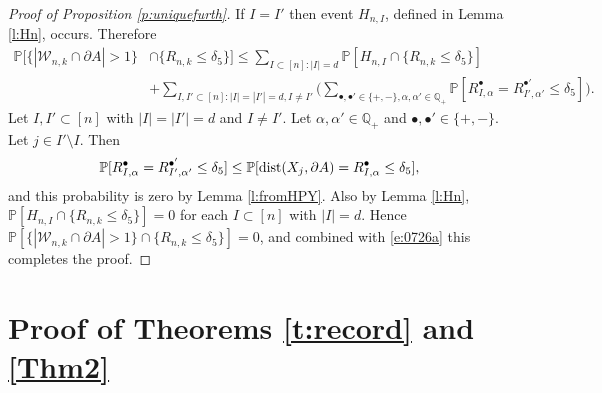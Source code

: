 \documentclass[12pt]{article}
\newcommand{\cW}{\mathcal{W}}
\renewcommand{\Pr}{\mathbb{P}}
\newcommand{\dist}{{\rm dist}}
\newcommand{\eqco}{\setcounter{equation}{0}}
\newcommand{\thco}{\setcounter{theo}{0}}
\newcommand{\prco}{\setcounter{prop}{0}}
\newcommand{\laco}{\setcounter{lemm}{0}}
\newcommand{\coco}{\setcounter{coro}{0}}
\newcommand{\cjco}{\setcounter{conj}{0}}
\newcommand{\deco}{\setcounter{defn}{0}}
\newcommand{\allco}{\eqco  \thco \prco \laco \coco \cjco \deco}
\begin{document}
\begin{proof}[Proof of Proposition \ref{p:uniquefurth}]
	If $I = I'$ then event $H_{n,I}$, defined in Lemma \ref{l:Hn},
	occurs. Therefore
	\begin{align*}
		\mathbb P[ \{| \cW_{n,k} \cap \partial A | > 1\}
		& \cap \{R_{n,k} \leq \delta_5 \}]
		 \leq \sum_{I \subset [n]:|I|=d} \mathbb P[H_{n,I}
		 \cap \{R_{n,k} \leq \delta_5\}]
		\\
		& + \sum_{I,I' \subset [n]: |I|= |I'|= d,I \neq I'}
		\Big(
		\sum_{\bullet,\bullet' \in \{+,-\}, \alpha, \alpha'
		\in \mathbb Q_+ %
		}
		\mathbb P
		[ R^\bullet_{I,\alpha}
		= R^{\bullet'}_{I',\alpha'} \leq \delta_5 ]
		\Big).
	\end{align*}
	Let $I, I' \subset [n]$ with $|I|=|I'|=d$ and $I \neq I'$.
	Let $\alpha, \alpha' \in \mathbb Q_+$ and $\bullet, \bullet'
	\in \{+,-\}$.
	Let $j \in I' \setminus I$. Then 
	\begin{align*}
		\Pr[ R^\bullet_{I,\alpha} = R^{\bullet'}_{I',\alpha'} \leq
		\delta_5]
		\leq \mathbb P[ \dist(X_{j},\partial A)=  
		R_{I,\alpha}^\bullet \leq \delta_5],
	\end{align*}
and this probability is zero by Lemma
	\ref{l:fromHPY}.
	Also by Lemma \ref{l:Hn}, 
	$\Pr[H_{n,I} \cap \{R_{n,k} \leq \delta_5\}] =0$ for each $I \subset [n]$ with $|I|=d$.
	Hence 
		$\mathbb P[ \{|\cW_{n,k} \cap \partial A | > 1\}
		 \cap \{R_{n,k} \leq \delta_5 \}] =0$,
		and combined with \eqref{e:0726a} this
		completes the proof.
\end{proof}

\section{Proof of Theorems \ref{t:record} and \ref{Thm2}}
\allco
\end{document}
